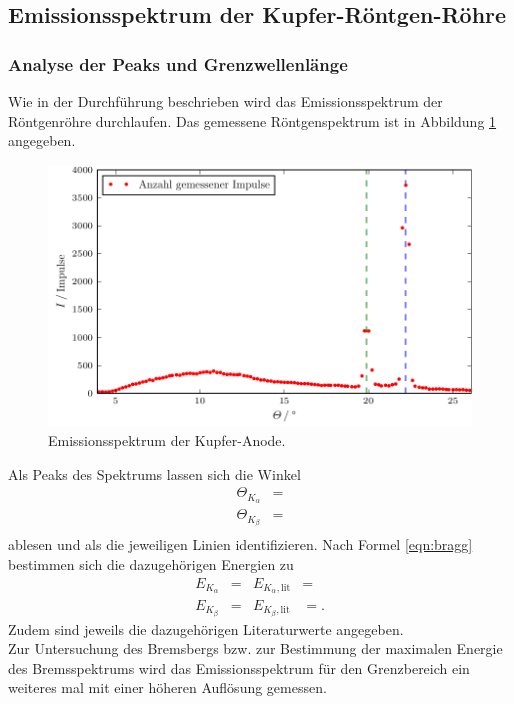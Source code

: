 \subsection{Emissionsspektrum der Kupfer-Röntgen-Röhre}
\subsubsection{Analyse der Peaks und Grenzwellenlänge}
Wie in der Durchführung beschrieben wird das Emissionsspektrum der Röntgenröhre durchlaufen.
Das gemessene Röntgenspektrum ist in Abbildung \ref{fig:plot2} angegeben.
\begin{figure}
  \centering
  \includegraphics{build/plot_2.pdf}
  \caption{Emissionsspektrum der Kupfer-Anode.}
  \label{fig:plot2}
\end{figure}
Als Peaks des Spektrums lassen sich die Winkel
\begin{align*}
   \Theta_{K_\alpha} &=   \\
   \Theta_{K_\beta} &=  \\
\end{align*}
ablesen und als die jeweiligen Linien identifizieren.
Nach Formel \eqref{eqn:bragg} bestimmen sich die dazugehörigen Energien zu
\begin{align*}
  E_{K_\alpha} &=  & E_{K_\alpha, \text{lit}} &=  \\
  E_{K_\beta} &=  & E_{K_\beta, \text{lit}} &=  .
\end{align*}
Zudem sind jeweils die dazugehörigen Literaturwerte \cite{energie} angegeben.\\
Zur Untersuchung des Bremsbergs bzw. zur Bestimmung der maximalen Energie des Bremsspektrums wird das Emissionsspektrum für den Grenzbereich ein weiteres mal mit einer höheren Auflösung gemessen.
